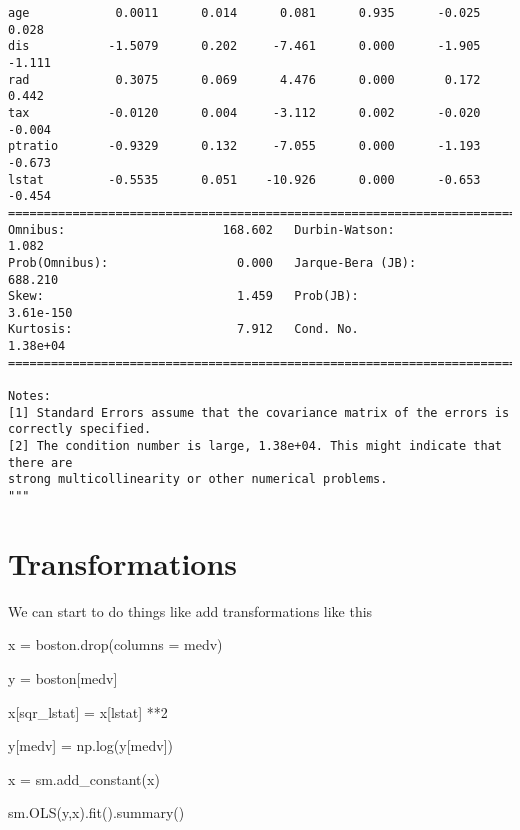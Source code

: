 \documentclass[
  letterpaper,
  DIV=11,
  numbers=noendperiod]{scrreprt}
\newenvironment{Shaded}{\begin{snugshade}}{\end{snugshade}}
\newcommand{\DecValTok}[1]{\textcolor[rgb]{0.68,0.00,0.00}{#1}}
\newcommand{\NormalTok}[1]{\textcolor[rgb]{0.00,0.23,0.31}{#1}}
\newcommand{\OperatorTok}[1]{\textcolor[rgb]{0.37,0.37,0.37}{#1}}
\newcommand{\StringTok}[1]{\textcolor[rgb]{0.13,0.47,0.30}{#1}}
\begin{document}
\begin{verbatim}
age            0.0011      0.014      0.081      0.935      -0.025       0.028
dis           -1.5079      0.202     -7.461      0.000      -1.905      -1.111
rad            0.3075      0.069      4.476      0.000       0.172       0.442
tax           -0.0120      0.004     -3.112      0.002      -0.020      -0.004
ptratio       -0.9329      0.132     -7.055      0.000      -1.193      -0.673
lstat         -0.5535      0.051    -10.926      0.000      -0.653      -0.454
==============================================================================
Omnibus:                      168.602   Durbin-Watson:                   1.082
Prob(Omnibus):                  0.000   Jarque-Bera (JB):              688.210
Skew:                           1.459   Prob(JB):                    3.61e-150
Kurtosis:                       7.912   Cond. No.                     1.38e+04
==============================================================================

Notes:
[1] Standard Errors assume that the covariance matrix of the errors is correctly specified.
[2] The condition number is large, 1.38e+04. This might indicate that there are
strong multicollinearity or other numerical problems.
"""
\end{verbatim}

\section{Transformations}\label{transformations}

We can start to do things like add transformations like this

\begin{Shaded}
\begin{Highlighting}[]
\NormalTok{x }\OperatorTok{=}\NormalTok{ boston.drop(columns }\OperatorTok{=} \StringTok{\textquotesingle{}medv\textquotesingle{}}\NormalTok{)}

\NormalTok{y }\OperatorTok{=}\NormalTok{ boston[}\StringTok{\textquotesingle{}medv\textquotesingle{}}\NormalTok{]}

\NormalTok{x[}\StringTok{\textquotesingle{}sqr\_lstat\textquotesingle{}}\NormalTok{] }\OperatorTok{=}\NormalTok{ x[}\StringTok{\textquotesingle{}lstat\textquotesingle{}}\NormalTok{] }\OperatorTok{**}\DecValTok{2}

\NormalTok{y[}\StringTok{\textquotesingle{}medv\textquotesingle{}}\NormalTok{] }\OperatorTok{=}\NormalTok{ np.log(y[}\StringTok{\textquotesingle{}medv\textquotesingle{}}\NormalTok{])}

\NormalTok{x }\OperatorTok{=}\NormalTok{ sm.add\_constant(x) }

\NormalTok{sm.OLS(y,x).fit().summary()}
\end{Highlighting}
\end{Shaded}
\end{document}
